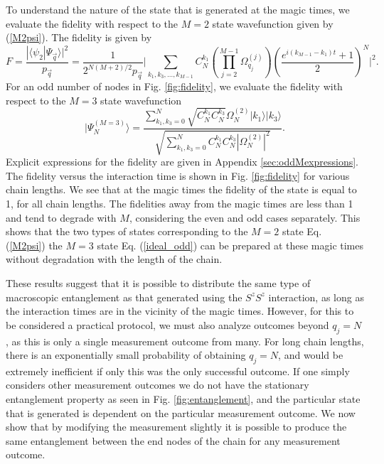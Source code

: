 \documentclass{WileyMSP-template}
\begin{document}
To understand the nature of the state that is generated at the magic times,  we evaluate the fidelity with respect to the $ M = 2$ state wavefunction given by (\ref{M2psi}). The fidelity is given by
%
\begin{equation}
F = \frac{| \langle  \psi_2 | \Psi_{\vec{q}} \rangle |^2}{p_{\vec{q}}}  = \frac{1}{2^{N(M+2)/2} p_{\vec{q}} } \Big| \sum_{k_1, k_3, \dots, k_{M-1} }C_N^{k_1}
\left( \prod_{j=2}^{M-1} \Omega_{q_j}^{(j)} \right) \left(\frac{e^{i(k_{M-1} - k_1)t }+1}{2}\right)^N \Big|^2 .
\label{fideven}
\end{equation}
%
For an odd number of nodes in Fig. \ref{fig:fidelity}, we evaluate the fidelity with respect to the $ M = 3$ state wavefunction
%
\begin{equation}
    \label{ideal_odd}
| \Psi_N^{(M=3)}  \rangle=\frac{\sum_{k_1,k_3=0}^{N} \sqrt{ C^{k_1}_{N}  C^{k_3}_{N} }
 \Omega_{N}^{(2)}  |k_1\rangle|k_3\rangle }{\sqrt{\sum_{k_1,k_3=0}^{N}  C^{k_1}_{N}  C^{k_3}_{N} | \Omega_{N}^{(2)} |^2 } } .
\end{equation}
%
Explicit expressions for the fidelity are given in Appendix \ref{sec:oddMexpressions}.  The fidelity versus the interaction time is shown in Fig. \ref{fig:fidelity} for various chain lengths. We see that at the magic times the fidelity of the state is equal to 1, for all chain lengths.   The fidelities away from the magic times are less than 1 and tend to degrade with $ M $, considering the even and odd cases separately. This shows that the two types of states corresponding to the $ M = 2 $ state Eq. (\ref{M2psi}) the $ M = 3 $ state Eq. (\ref{ideal_odd}) can be prepared at these magic times without degradation with the length of the chain.

These results suggest that it is possible to distribute the same type of macroscopic entanglement as that generated using the $ S^z S^z $ interaction, as long as the interaction times are in the vicinity of the magic times.  However, for this to be considered a practical protocol, we must also analyze outcomes beyond $ q_j = N $, as this is only a single measurement outcome from many.
For long chain lengths, there is an exponentially small probability of obtaining $ q_j = N $, and  would be extremely inefficient if only this was the only successful outcome.  If one simply considers other measurement outcomes we do not have the stationary entanglement property as seen in Fig. \ref{fig:entanglement}, and the particular state that is generated is dependent on the particular measurement outcome.  We now show that by modifying the measurement slightly it is possible to produce the same entanglement between the end nodes of the chain for any measurement outcome.
\end{document}
